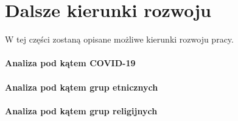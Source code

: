 \documentclass[11pt]{report}
\begin{document}
    \section{Dalsze kierunki rozwoju}
    W tej części zostaną opisane możliwe kierunki rozwoju pracy.

    \paragraph{Analiza pod kątem COVID-19}

    \paragraph{Analiza pod kątem grup etnicznych}

    \paragraph{Analiza pod kątem grup religijnych}



    \newpage
    \printbibliography[title={Bibliografia}]
\end{document}
